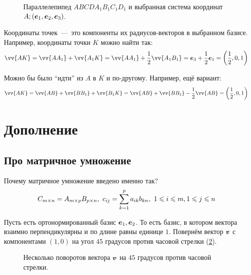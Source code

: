 \documentclass[a4paper,12pt]{article}
\begin{document}
\begin{solution}
\begin{figure}[h]
      
      \caption{Параллелепипед $ABCDA_1B_1C_1D_1$ и выбранная система координат $A; (\boldsymbol e_1, \boldsymbol e_2, \boldsymbol e_3)$.}
      \label{fig:parallelepiped}
    \end{figure}
    
    Координаты точек~---~это компоненты их радиусов-векторов в выбранном базисе.
    Например, координаты точки $K$ можно найти так:
    \[
      \vv{AK} = \vv{AA_1} + \vv{A_1K}
      = \vv{AA_1} + \frac{1}{2} \vv{A_1B_1}
      = \bds e_3 + \frac{1}{2} \bds e_1
      = \left(\frac{1}{2}, 0, 1\right)
    \]
    
    Можно бы было ``идти'' из $A$ в $K$ и по-другому.
    Например, ещё вариант:
    \[
      \vv{AK} = \vv{AB} + \vv{BB_1} + \vv{B_1K}
      = \vv{AB} + \vv{BB_1} - \frac{1}{2} \vv{AB}
      = \left(\frac{1}{2}, 0, 1\right)
    \]
  \end{solution}
  
  
  \section{Дополнение}
  
  \subsection{Про матричное умножение}
  
  Почему матричное умножение введено именно так?
  \[
    C_{m\times n} \hm= A_{m\times p}B_{p\times n},\ c_{ij} \hm= \sum\limits_{k=1}^p a_{ik} b_{kn},\ 1 \hm\leq i \hm\leq m, 1 \hm\leq j \hm\leq n
  \]
  
  Пусть есть ортонормированный базис $\boldsymbol e_1, \boldsymbol e_2$.
  То есть базис, в котором вектора взаимно перпендикулярны и по длине равны единице $1$.
  Повернём вектор $\boldsymbol v$ с компонентами $(1, 0)$ на угол $45$ градусов против часовой стрелки (\ref{fig:turning-vector}).
  
  \begin{figure}[h]
    \centering
    
    
    \caption{Несколько поворотов вектора $\boldsymbol v$ на $45$ градусов против часовой стрелки.}
    \label{fig:turning-vector}
  \end{figure}
  
\end{document}
